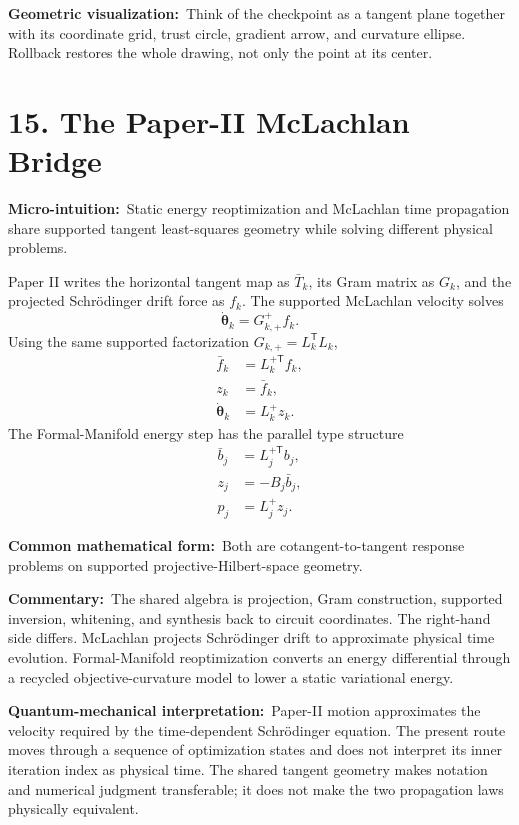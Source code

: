 \documentclass[10pt,twocolumn]{article}
\newcommand{\micro}[1]{\par\noindent\textbf{Micro-intuition:}\ #1\par}
\newcommand{\form}[1]{\par\noindent\textbf{Common mathematical form:}\ #1\par}
\newcommand{\commentary}[1]{\par\noindent\textbf{Commentary:}\ #1\par}
\newcommand{\phys}[1]{\par\noindent\textbf{Quantum-mechanical interpretation:}\ #1\par}
\newcommand{\geom}[1]{\par\noindent\textbf{Geometric visualization:}\ \textcolor{teal!70!black}{#1}\par}
\newcommand{\conceptbreak}{\par\medskip\noindent{\color{black!30}\rule{\columnwidth}{0.35pt}}\par\medskip}
\begin{document}
\geom{Think of the checkpoint as a tangent plane together with its coordinate
grid, trust circle, gradient arrow, and curvature ellipse. Rollback restores
the whole drawing, not only the point at its center.}

\conceptbreak

\section*{15. The Paper-II McLachlan Bridge}

\micro{Static energy reoptimization and McLachlan time propagation share
supported tangent least-squares geometry while solving different physical
problems.}

Paper II writes the horizontal tangent map as \(\bar T_k\), its Gram matrix as
\(G_k\), and the projected Schr\"odinger drift force as \(f_k\). The supported
McLachlan velocity solves
\begin{equation}
\dot{\bm\theta}_k=G_{k,+}^+f_k.
\label{eq:mclachlan-velocity}
\end{equation}
Using the same supported factorization \(G_{k,+}=L_k^{\mathsf T}L_k\),
\begin{align}
\bar f_k&=L_k^{+\mathsf T}f_k,
\label{eq:mclachlan-frame-force}\\
z_k&=\bar f_k,
\label{eq:mclachlan-frame-velocity}\\
\dot{\bm\theta}_k&=L_k^+z_k.
\label{eq:mclachlan-lift}
\end{align}
The Formal-Manifold energy step has the parallel type structure
\begin{align}
\bar b_j&=L_j^{+\mathsf T}b_j,
\label{eq:static-frame-differential}\\
z_j&=-B_j\bar b_j,
\label{eq:static-frame-step}\\
p_j&=L_j^+z_j.
\label{eq:static-lift}
\end{align}

\form{Both are cotangent-to-tangent response problems on supported
projective-Hilbert-space geometry.}

\commentary{The shared algebra is projection, Gram construction, supported
inversion, whitening, and synthesis back to circuit coordinates. The right-hand
side differs. McLachlan projects Schr\"odinger drift to approximate physical
time evolution. Formal-Manifold reoptimization converts an energy differential
through a recycled objective-curvature model to lower a static variational
energy.}

\phys{Paper-II motion approximates the velocity required by the time-dependent
Schr\"odinger equation. The present route moves through a sequence of
optimization states and does not interpret its inner iteration index as
physical time. The shared tangent geometry makes notation and numerical
judgment transferable; it does not make the two propagation laws physically
equivalent.}
\end{document}
